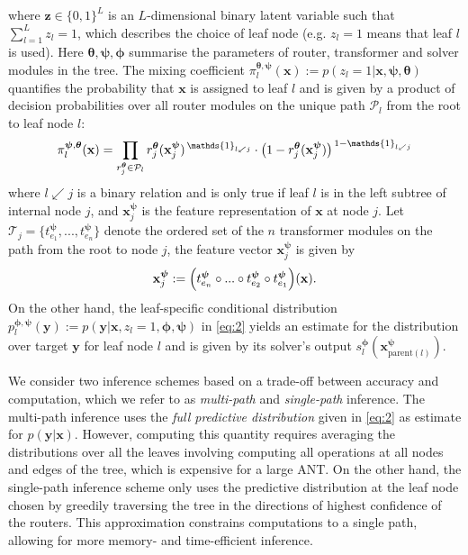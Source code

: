 where $\mathbf{z} \in \{0, 1\}^L$ is an $L$-dimensional binary latent variable such that $\sum_{l=1}^{L}z_l = 1$, which describes the choice of leaf node (e.g. $z_l = 1$ means that leaf $l$ is used). Here $\boldsymbol{\theta}, \boldsymbol{\psi}, \boldsymbol{\phi}$ summarise the parameters of router, transformer and solver modules in the tree. The mixing coefficient $\pi_{l}^{\boldsymbol{\theta}, \boldsymbol{\psi}}(\mathbf{x}) := p(z_l=1|\mathbf{x}, \boldsymbol{\psi}, \boldsymbol{\theta})$ quantifies the probability that $\mathbf{x}$ is assigned to leaf $l$ and is given by a product of decision probabilities over all router modules on the unique path $\mathcal{P}_l$ from the root to leaf node $l$:
\begin{equation}
\pi_{l}^{\boldsymbol{\psi}, \boldsymbol{\theta}}(\mathbf{x}) = \prod_{r_{j}^{\boldsymbol{\theta}} \in  \mathcal{P}_l} r_{j}^{\boldsymbol{\theta}}(\mathbf{x}^{\boldsymbol{\psi}}_j)^{\,\mathds{1}_{l \swarrow j}}
\cdot \big{(}1-r_{j}^{\boldsymbol{\theta}}(\mathbf{x}^{\boldsymbol{\psi}}_j)\big{)}^{\,1-\mathds{1}_{l \swarrow j}}
\end{equation}
where $l \swarrow j$ is a binary relation and is only true if leaf $l$ is in the left subtree of internal node $j$, and $\mathbf{x}^{\boldsymbol{\psi}}_j$ is the feature representation of $\mathbf{x}$ at node $j$. Let $\mathcal{T}_j = \{t_{e_1}^{\boldsymbol{\psi}}, ..., t_{e_{n}}^{\boldsymbol{\psi}}\}$ denote the ordered set of the $n$  transformer modules on the path from the root to node $j$, the feature vector $\mathbf{x}^{\boldsymbol{\psi}}_j$ is given by
\begin{equation*}\nonumber
\mathbf{x}^{\boldsymbol{\psi}}_j := 
\Big{(}
t_{e_{n}}^{\boldsymbol{\psi}}
\circ ... \circ
t_{e_{2}}^{\boldsymbol{\psi}}
\circ 		
t_{e_{1}}^{\boldsymbol{\psi}}
\Big{)} (\mathbf{x}).
\vspace{-2mm}
\end{equation*}
On the other hand, the leaf-specific conditional distribution $p_{l}^{\boldsymbol{\phi}, \boldsymbol{\psi}}(\mathbf{y}) := p(\mathbf{y}|\mathbf{x}, z_{l}=1,\boldsymbol{\phi}, \boldsymbol{\psi})$ in \eqref{eq:2}  yields an estimate for the distribution over target $\mathbf{y}$ for leaf node $l$ and is given by its solver's output
 $s_{l}^{\boldsymbol{\phi}}(\mathbf{x}^{\boldsymbol{\psi}}_{\mathrm{parent}(l)})$. 
 
We consider two inference schemes based on a trade-off between accuracy and computation, which we refer to as \textit{multi-path} and \textit{single-path} inference. The multi-path inference uses the \textit{full predictive distribution} given in \eqref{eq:2} as estimate for $p(\mathbf{y}|\mathbf{x})$. However, computing this quantity requires averaging the distributions over all the leaves involving computing all operations at all nodes and edges of the tree, which is expensive for a large ANT. On the other hand, the single-path inference scheme only uses the predictive distribution at the leaf node chosen by greedily traversing the tree in the directions of highest confidence of the routers. This approximation constrains computations to a single path, allowing for more memory- and time-efficient inference.

